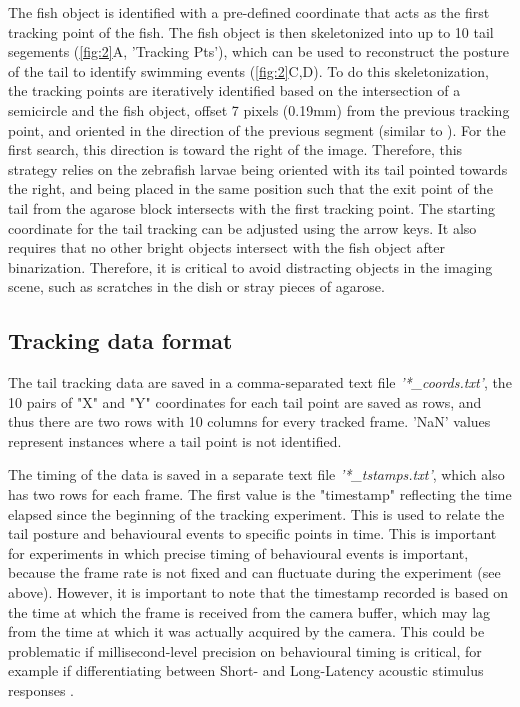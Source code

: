 \documentclass[9pt,lineno]{RandlettLab_elife}
\begin{document}
The fish object is identified with a pre-defined coordinate that acts as the first tracking point of the fish. The fish object is then skeletonized into up to 10 tail segements (\autoref{fig:2}A, 'Tracking Pts'), which can be used to reconstruct the posture of the tail to identify swimming events (\autoref{fig:2}C,D). To do this skeletonization, the tracking points are iteratively identified based on the intersection of a semicircle and the fish object, offset 7 pixels (0.19mm) from the previous tracking point, and oriented in the direction of the previous segment (similar to \cite{Stih2019-gx, Randlett2019-fj}). For the first search, this direction is toward the right of the image. Therefore, this strategy relies on the zebrafish larvae being oriented with its tail pointed towards the right, and being placed in the same position such that the exit point of the tail from the agarose block intersects with the first tracking point. The starting coordinate for the tail tracking can be adjusted using the arrow keys. It also requires that no other bright objects intersect with the fish object after binarization. Therefore, it is critical to avoid distracting objects in the imaging scene, such as scratches in the dish or stray pieces of agarose.  

\subsection{Tracking data format}

The tail tracking data are saved in a comma-separated text file \emph{'*\_coords.txt'}, the 10 pairs of "X" and "Y" coordinates for each tail point are saved as rows, and thus there are two rows with 10 columns for every tracked frame. 'NaN' values represent instances where a tail point is not identified. 

The timing of the data is saved in a separate text file \emph{'*\_tstamps.txt'}, which also has two rows for each frame. The first value is the "timestamp" reflecting the time elapsed since the beginning of the tracking experiment. This is used to relate the tail posture and behavioural events to specific points in time. This is important for experiments in which precise timing of behavioural events is important, because the frame rate is not fixed and can fluctuate during the experiment (see above). However, it is important to note that the timestamp recorded is based on the time at which the frame is received from the camera buffer, which may lag from the time at which it was actually acquired by the camera. This could be problematic if millisecond-level precision on behavioural timing is critical, for example if differentiating between Short- and Long-Latency acoustic stimulus responses \citep{Burgess2007}. 
\end{document}
